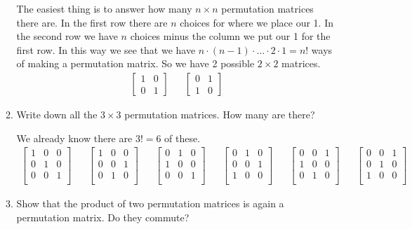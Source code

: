 \documentclass[letterpaper]{article}
\begin{document}
\begin{enumerate}
\begin{enumerate}
  The easiest thing is to answer how many $n\times n$ permutation matrices there are. In the first row there are $n$ choices for where we place our 1. In the second row we have $n$ choices minus the column we put our 1 for the first row. In this way we see that we have $n\cdot(n-1)\cdot\dots\cdot2\cdot1=n!$ ways of making a permutation matrix. So we have 2 possible $2\times 2$ matrices.
  \begin{align*}
    \left[\begin{array}{cc}1&0\\0&1\end{array}\right]&&
    \left[\begin{array}{cc}0&1\\1&0\end{array}\right]
  \end{align*}
  \item
  Write down all the $3\times 3$ permutation matrices. How many are there?

  We already know there are $3!=6$ of these.
  \begin{align*}
    \left[\begin{array}{ccc}
      1&0&0\\
      0&1&0\\
      0&0&1\\
    \end{array}\right]&&
    \left[\begin{array}{ccc}
      1&0&0\\
      0&0&1\\
      0&1&0\\
    \end{array}\right]&&
    \left[\begin{array}{ccc}
      0&1&0\\
      1&0&0\\
      0&0&1\\
    \end{array}\right]&&
    \left[\begin{array}{ccc}
      0&1&0\\
      0&0&1\\
      1&0&0\\
    \end{array}\right]&&
    \left[\begin{array}{ccc}
      0&0&1\\
      1&0&0\\
      0&1&0\\
    \end{array}\right]&&
    \left[\begin{array}{ccc}
      0&0&1\\
      0&1&0\\
      1&0&0\\
    \end{array}\right]&&
  \end{align*}
  \item
  Show that the product of two permutation matrices is again a permutation matrix. Do they commute?


\end{enumerate}
\end{enumerate}
\end{document}
